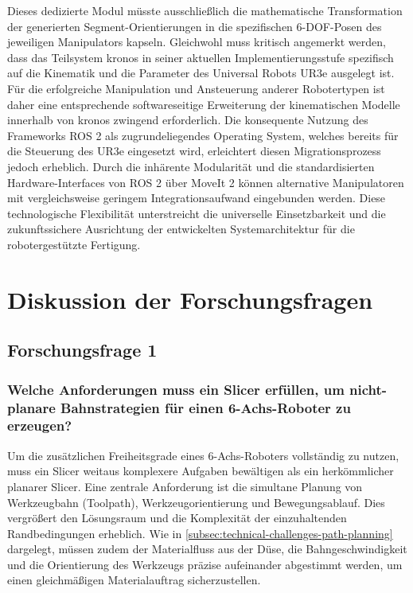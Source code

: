     Dieses dedizierte Modul müsste ausschließlich die mathematische Transformation der generierten Segment-Orientierungen in die spezifischen 6-\ac{DOF}-Posen des jeweiligen Manipulators kapseln.
    Gleichwohl muss kritisch angemerkt werden, dass das Teilsystem \ac{kronos} in seiner aktuellen Implementierungsstufe spezifisch auf die Kinematik und die Parameter des Universal Robots UR3e ausgelegt ist.
    Für die erfolgreiche Manipulation und Ansteuerung anderer Robotertypen ist daher eine entsprechende softwareseitige Erweiterung der kinematischen Modelle innerhalb von \ac{kronos} zwingend erforderlich.
    Die konsequente Nutzung des Frameworks \ac{ROS} 2 als zugrundeliegendes Operating System, welches bereits für die Steuerung des UR3e eingesetzt wird, erleichtert diesen Migrationsprozess jedoch erheblich.
    Durch die inhärente Modularität und die standardisierten Hardware-Interfaces von \ac{ROS} 2 über MoveIt 2 können alternative Manipulatoren mit vergleichsweise geringem Integrationsaufwand eingebunden werden.
    Diese technologische Flexibilität unterstreicht die universelle Einsetzbarkeit und die zukunftssichere Ausrichtung der entwickelten Systemarchitektur für die robotergestützte Fertigung.

  \section{Diskussion der Forschungsfragen}
    \subsection{Forschungsfrage 1}
      \subsubsection{Welche Anforderungen muss ein Slicer erfüllen, um nicht-planare Bahnstrategien für einen 6-Achs-Roboter zu erzeugen?}
        Um die zusätzlichen Freiheitsgrade eines 6-Achs-Roboters vollständig zu nutzen, muss ein Slicer weitaus komplexere Aufgaben bewältigen als ein herkömmlicher planarer Slicer.
        Eine zentrale Anforderung ist die simultane Planung von Werkzeugbahn (Toolpath), Werkzeugorientierung und Bewegungsablauf.
        Dies vergrößert den Lösungsraum und die Komplexität der einzuhaltenden Randbedingungen erheblich.
        Wie in \ref{subsec:technical-challenges-path-planning} dargelegt, müssen zudem der Materialfluss aus der Düse, die Bahngeschwindigkeit und die Orientierung des Werkzeugs präzise aufeinander abgestimmt werden, um einen gleichmäßigen Materialauftrag sicherzustellen.

